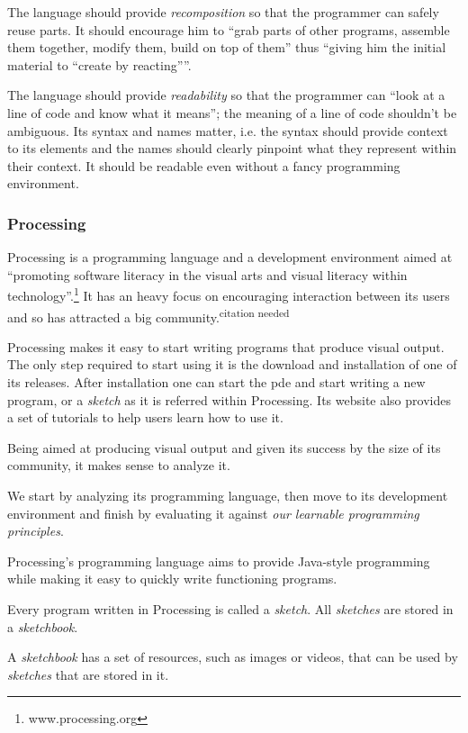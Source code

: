\documentclass{./llncs2e/llncs}
\begin{document}
The language should provide \emph{recomposition} so that the programmer can safely reuse parts. It should encourage him to ``grab parts of other programs, assemble them together, modify them, build on top of them'' thus ``giving him the initial material to ``create by reacting''''.

The language should provide \emph{readability} so that the programmer can ``look at a line of code and know what it means''; the meaning of a line of code shouldn't be ambiguous. Its syntax and names matter, i.e. the syntax should provide context to its elements and the names should clearly pinpoint what they represent within their context. It should be readable even without a fancy programming environment.

\subsubsection{Processing\cite{reas2007processing}}
Processing is a programming language and a development environment aimed at ``promoting software literacy in the visual arts and visual literacy within technology''.\footnote{www.processing.org} It has an heavy focus on encouraging interaction between its users and so has attracted a big community.\textsuperscript{citation needed}

Processing makes it easy to start writing programs that produce visual output. The only step required to start using it is the download and installation of one of its releases. After installation one can start the \ac{pde} and start writing a new program, or a \emph{sketch} as it is referred within Processing. Its website also provides a set of tutorials to help users learn how to use it.

Being aimed at producing visual output and given its success by the size of its community, it makes sense to analyze it.

We start by analyzing its programming language, then move to its development environment and finish by evaluating it against \emph{our learnable programming principles}.

Processing's programming language aims to provide Java-style programming while making it easy to quickly write functioning programs. 

Every program written in Processing is called a \emph{sketch}. All \emph{sketches} are stored in a \emph{sketchbook}.

A \emph{sketchbook} has a set of resources, such as images or videos, that can be used by \emph{sketches} that are stored in it.
\end{document}
